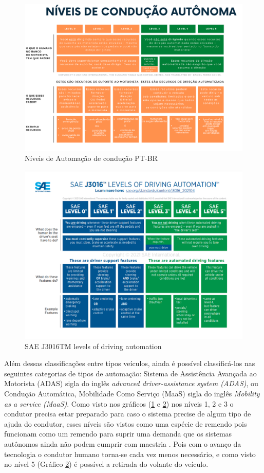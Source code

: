 \begin{figure}[H]
\centering
\includegraphics[width=\textwidth]{Figures/IC-Graph1.png}
\caption{Níveis de Automação de condução PT-BR}
\label{Graph_PT}
\end{figure}
\begin{figure}[H]
\centering
\includegraphics[width=\textwidth]{Figures/IC-GrapEN.png}
\caption{SAE J3016TM levels of driving automation}
\label{Graph_EN}
\end{figure}

Além dessas classificações entre tipos veículos, ainda é possível classificá-los nas seguintes categorias de tipos de automação: Sistema de Assistência Avançada ao Motorista (ADAS) sigla do inglês \textit{advanced driver-assistance system (ADAS)}, ou Condução Automática, Mobilidade Como Serviço (MaaS) sigla do inglês \textit{Mobility as a service (MaaS)}.
Como visto nos gráficos (\ref{Graph_PT} e \ref{Graph_EN}) nos níveis 1, 2 e 3 o condutor precisa estar preparado para caso o sistema precise de algum tipo de ajuda do condutor, esses níveis são vistos como uma espécie de remendo pois funcionam como um remendo para suprir uma demanda que os sistemas autônomos ainda não podem cumprir com maestria \cite{4cenarios_ocidental}. Pois com o avanço da tecnologia o condutor humano torna-se cada vez menos necessário, e como visto no nível 5 (Gráfico \ref{Graph_EN}) é possível a retirada do volante do veículo. 

